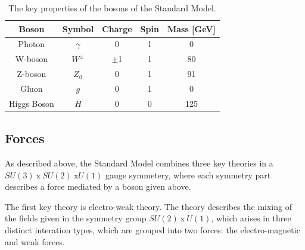 \begin{itemize}[leftmargin=*]
  {\renewcommand{\arraystretch}{1.5}
  \begin{table}[!ht]
  \begin{center}
    \begin{tabular}{|c||c|c|c|c|}
      \hline
    Boson            & Symbol        & Charge  &  Spin  &  Mass [GeV]\\
    \hline
    Photon           &   $\gamma$    &  0      &  1     &  0 \\
    W-boson          &   $W^{\pm}$    & $\pm$1  &  1     &  80 \\
    Z-boson          &   $Z_0$       &  0      &  1     &  91\\
    Gluon            &   $g$         &  0      &  1     &  0 \\
    Higgs Boson      &   $H$         &  0      &  0     &  125\\
    \hline  
  \end{tabular}
    \caption{The key properties of the bosons of the  Standard Model. }
  \label{tab:theo-sm_bosons}
  \end{center}
  \end{table}}
    
\end{itemize}

\subsection{Forces}

As described above, the Standard Model combines three key theories in a
$SU(3)~\text{x}~SU(2)~\text{x}U(1)$ gauge symmetery,
where each symmetry part describes a force mediated by a boson given above.

The first key theory is electro-weak theory.
The theory describes the mixing of the fields given in the symmetry group $SU(2)~\text{x}~U(1)$,
which arises in three distinct interation types, which are grouped into two forces:
the electro-magnetic and weak forces.

